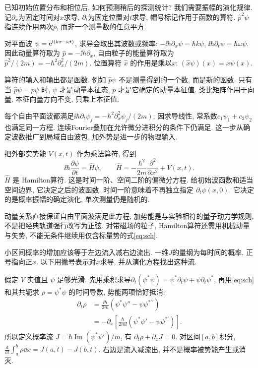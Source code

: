 已知初始位置分布和相位后, 如何预测稍后的探测统计? 我们需要振幅的演化规律. 记$\partial_x$为固定时间对$x$求导, $\partial_t$为固定位置对$t$求导, 帽号标记作用于函数的算符. $\hat p^2\psi$指连续作用两次$\hat p$, 而非一个测量数的任意平方.

对平面波 $\psi=\mathrm e^{\mathrm i(kx-\omega t)}$, 求导会取出其波数或频率: $-\ii\hbar\partial_x\psi=\hbar k\psi$, $\ii\hbar\partial_t\psi=\hbar\omega\psi$. 因此动量算符取为 $\hat p=-\ii\hbar\partial_x$, 自由粒子的能量算符取为 $\hat p^2/(2m)=-\hbar^2\partial_x^2/(2m)$. 位置算符 $\hat x$ 的作用是乘以$x$: $(\hat x\psi)(x)=x\psi(x)$.

算符的输入和输出都是函数. 例如 $\hat p\psi$ 不是测量得到的一个数, 而是新的函数. 只有当 $\hat p\psi=p\psi$ 时, $\psi$ 才是动量本征态, $p$ 才是它确定的动量本征值. 类比矩阵作用于向量, 本征向量方向不变, 只乘上本征值.

每个自由平面波都满足$\ii\hbar\partial_t\psi_j=-\hbar^2\partial_x^2\psi_j/(2m)$; 因求导线性, 常系数$c_1\psi_1+c_2\psi_2$也满足同一方程. 连续Fourier叠加在允许微分进积分的条件下仍满足. 这一步从确定波数推广到局域自由波包, 加外势是进一步的物理输入.

把外部实势能 $V(x,t)$ 作为乘法算符, 得到
\begin{equation}\label{eq:sch}
\ii\hbar\frac{\partial\psi}{\partial t}
=\hat H\psi,\qquad
\hat H=-\frac{\hbar^2}{2m}\frac{\partial^2}{\partial x^2}+V(x,t).
\end{equation}
$\hat H$ 是 Hamilton算符. 这是时间一阶、空间二阶的偏微分方程. 给初始波函数和适当空间边界, 它决定之后的波函数. 时间一阶意味着不再独立指定 $\partial_t\psi(x,0)$. 它决定的是概率振幅的确定演化, 单次测量仍是随机的.

动量关系直接保证自由平面波满足此方程; 加势能是与实验相符的量子动力学规则, 不是把经典轨道强行改写为正弦. 对带磁场的粒子, Hamilton算符还需用机械动量与矢势, 不能无条件继续用仅含标量势的式\eqref{eq:sch}.

小区间概率的增加应该等于左边流入减右边流出. 一维$J$的量纲为每时间的概率, 正号指向正$x$. 以下用撇号表示对$x$求导, 并从演化方程找出这种流.

假定 $V$ 实值且 $\psi$ 足够光滑. 先用乘积求导$\partial_t(\psi^*\psi)=\psi^*\partial_t\psi+\psi\partial_t\psi^*$, 再用\eqref{eq:sch}和其共轭求 $\rho=\psi^*\psi$ 的时间导数, 势能两项恰好抵消:
\begin{align*}
\partial_t\rho
&=\frac{\ii\hbar}{2m}(\psi^*\psi''-\psi\psi^{*\prime\prime})\\
&=-\partial_x\left[\frac{\hbar}{2m\ii}(\psi^*\psi'-\psi\psi^{*\prime})\right].
\end{align*}
所以定义概率流 $J=\hbar\operatorname{Im}(\psi^*\psi')/m$, 有 $\partial_t\rho+\partial_xJ=0$. 对区间$[a,b]$积分, $\frac{\mathrm d}{\mathrm dt}\int_a^b\rho\dd x=J(a,t)-J(b,t)$. 右边是流入减流出, 并不是概率被势能产生或消灭.

